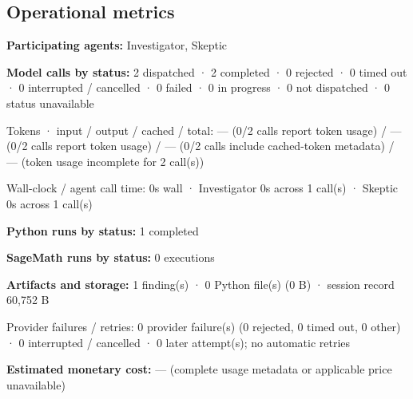 \documentclass[11pt]{article}
\begin{document}
\subsection{Operational metrics}
\textbf{Participating agents:} Investigator, Skeptic\par
\textbf{Model calls by status:} 2 dispatched · 2 completed · 0 rejected · 0 timed out · 0 interrupted / cancelled · 0 failed · 0 in progress · 0 not dispatched · 0 status unavailable\par
Tokens · input / output / cached / total: — (0/2 calls report token usage) / — (0/2 calls report token usage) / — (0/2 calls include cached-token metadata) / — (token usage incomplete for 2 call(s))\par
Wall-clock / agent call time: 0s wall · Investigator 0s across 1 call(s) · Skeptic 0s across 1 call(s)\par
\textbf{Python runs by status:} 1 completed\par
\textbf{SageMath runs by status:} 0 executions\par
\textbf{Artifacts and storage:} 1 finding(s) · 0 Python file(s) (0 B) · session record 60,752 B\par
Provider failures / retries: 0 provider failure(s) (0 rejected, 0 timed out, 0 other) · 0 interrupted / cancelled · 0 later attempt(s); no automatic retries\par
\textbf{Estimated monetary cost:} — (complete usage metadata or applicable price unavailable)\par
\end{document}
